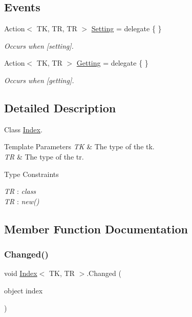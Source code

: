 \subsection*{Events}
\begin{DoxyCompactItemize}
\item 
Action$<$ TK, TR, TR $>$ \hyperlink{class_index_aa53b2a997b85088499bc11af6ca6ddfc}{Setting} = delegate \{ \}
\begin{DoxyCompactList}\small\item\em Occurs when \mbox{[}setting\mbox{]}. \end{DoxyCompactList}\item 
Action$<$ TK, TR $>$ \hyperlink{class_index_a7b5c195702db7df525a4ae4dd9f17d36}{Getting} = delegate \{ \}
\begin{DoxyCompactList}\small\item\em Occurs when \mbox{[}getting\mbox{]}. \end{DoxyCompactList}\end{DoxyCompactItemize}


\subsection{Detailed Description}
Class \hyperlink{class_index}{Index}. 


\begin{DoxyTemplParams}{Template Parameters}
{\em TK} & The type of the tk.\\
\hline
{\em TR} & The type of the tr.\\
\hline
\end{DoxyTemplParams}
\begin{Desc}
\item[Type Constraints]\begin{description}
\item[{\em TR} : {\em class}]\item[{\em TR} : {\em new()}]\end{description}
\end{Desc}


\subsection{Member Function Documentation}
\mbox{\label{class_index_a3e67374081c64d8097112ab9286bbf1b}} 
\subsubsection{\texorpdfstring{Changed()}{Changed()}}
{\footnotesize\ttfamily void \hyperlink{class_index}{Index}$<$ TK, TR $>$.Changed (\begin{DoxyParamCaption}\item[{object}]{index }\end{DoxyParamCaption})\hspace{0.3cm}{\ttfamily [inline]}}



